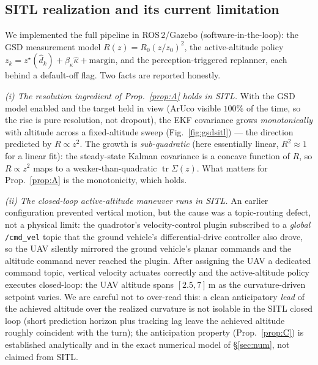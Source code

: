 \documentclass[10pt]{article}
\theoremstyle{remark}\newtheorem{remark}{Remark}
\newcommand{\zstar}{z^{\star}}
\begin{document}
\subsection*{SITL realization and its current limitation}

We implemented the full pipeline in ROS\,2/Gazebo (software-in-the-loop): the GSD
measurement model $R(z)=R_0(z/z_0)^2$, the active-altitude policy
$z_k=\zstar(\hat d_k)+\beta_\kappa\hat\kappa+\text{margin}$, and the perception-triggered
replanner, each behind a default-off flag. Two facts are reported honestly.

\emph{(i) The resolution ingredient of Prop.~\ref{prop:A} holds in SITL.} With the GSD model
enabled and the target held in view (ArUco visible $100\%$ of the time, so the rise is pure
resolution, not dropout), the EKF covariance grows \emph{monotonically} with altitude across a
fixed-altitude sweep (Fig.~\ref{fig:gsdsitl}) --- the direction predicted by $R\propto z^2$.
The growth is \emph{sub-quadratic} (here essentially linear, $R^2\!\approx\!1$ for a linear
fit): the steady-state Kalman covariance is a concave function of $R$, so $R\propto z^2$ maps
to a weaker-than-quadratic $\operatorname{tr}\Sigma(z)$. What matters for Prop.~\ref{prop:A} is
the monotonicity, which holds.

\emph{(ii) The closed-loop active-altitude maneuver runs in SITL.} An earlier configuration
prevented vertical motion, but the cause was a topic-routing defect, not a physical limit: the
quadrotor's velocity-control plugin subscribed to a \emph{global} \texttt{/cmd\_vel} topic that
the ground vehicle's differential-drive controller also drove, so the UAV silently mirrored the
ground vehicle's planar commands and the altitude command never reached the plugin. After
assigning the UAV a dedicated command topic, vertical velocity actuates correctly and the
active-altitude policy executes closed-loop: the UAV altitude spans $[2.5,7]$\,m as the
curvature-driven setpoint varies. We are careful not to over-read this: a clean anticipatory
\emph{lead} of the achieved altitude over the realized curvature is not isolable in the SITL
closed loop (short prediction horizon plus tracking lag leave the achieved altitude roughly
coincident with the turn); the anticipation property (Prop.~\ref{prop:C}) is established
analytically and in the exact numerical model of \S\ref{sec:num}, not claimed from SITL.
\end{document}
